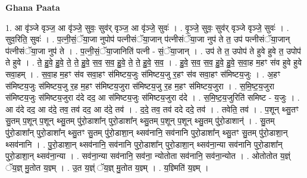 \documentclass[17pt]{extarticle}
\begin{document}
\textbf{Ghana Paata } \newline

1. आ वृ॑ञ्जे वृञ्ज॒ आ वृ॑ञ्जे॒ सुवः॒ सुव॑र् वृञ्ज॒ आ वृ॑ञ्जे॒ सुवः॑ । . वृ॒ञ्जे॒ सुवः॒ सुव॑र् वृञ्जे वृञ्जे॒ सुवः॑ । . सुव॒रिति॒ सुवः॑ । . प॒त्नी॒सं॒ॅया॒जा नुपोप॑ पत्नीसंॅया॒जान् प॑त्नीसंॅया॒जा नुप॑ ते त॒ उप॑ पत्नीसंॅया॒जान् प॑त्नीसंॅया॒जा नुप॑ ते । . प॒त्नी॒सं॒ॅया॒जानिति॑ पत्नी - सं॒ॅया॒जान् । . उप॑ ते त॒ उपोप॑ ते हुवे हुवे त॒ उपोप॑ ते हुवे । . ते॒ हु॒वे॒ हु॒वे॒ ते॒ ते॒ हु॒वे॒ स॒व॒ स॒व॒ हु॒वे॒ ते॒ ते॒ हु॒वे॒ स॒व॒ । . हु॒वे॒ स॒व॒ स॒व॒ हु॒वे॒ हु॒वे॒ स॒वा॒ह म॒हꣳ स॑व हुवे हुवे सवा॒हम् । . स॒वा॒ह म॒हꣳ स॑व सवा॒हꣳ स॑मिष्टय॒जुः स॑मिष्टय॒जु र॒हꣳ स॑व सवा॒हꣳ स॑मिष्टय॒जुः । . अ॒हꣳ स॑मिष्टय॒जुः स॑मिष्टय॒जु र॒ह म॒हꣳ स॑मिष्टय॒जुरा स॑मिष्टय॒जु र॒ह म॒हꣳ स॑मिष्टय॒जुरा । . स॒मि॒ष्ट॒य॒जुरा स॑मिष्टय॒जुः स॑मिष्टय॒जुरा द॑दे दद॒ आ स॑मिष्टय॒जुः स॑मिष्टय॒जुरा द॑दे । . स॒मि॒ष्ट॒य॒जुरिति॑ समिष्ट - य॒जुः । . आ द॑दे दद॒ आ द॑दे॒ तव॒ तव॑ दद॒ आ द॑दे॒ तव॑ । . द॒दे॒ तव॒ तव॑ ददे ददे॒ तव॑ । . तवेति॒ तव॑ । . प॒शून् थ्सु॒तꣳ सु॒तम् प॒शून् प॒शून् थ्सु॒तम् पु॑रो॒डाशा᳚न् पुरो॒डाशा᳚न् थ्सु॒तम् प॒शून् प॒शून् थ्सु॒तम् पु॑रो॒डाशान्॑ । . सु॒तम् पु॑रो॒डाशा᳚न् पुरो॒डाशा᳚न् थ्सु॒तꣳ सु॒तम् पु॑रो॒डाशा॒न् थ्सव॑नानि॒ सव॑नानि पुरो॒डाशा᳚न् थ्सु॒तꣳ सु॒तम् पु॑रो॒डाशा॒न् थ्सव॑नानि । . पु॒रो॒डाशा॒न् थ्सव॑नानि॒ सव॑नानि पुरो॒डाशा᳚न् पुरो॒डाशा॒न् थ्सव॑ना॒न्या सव॑नानि पुरो॒डाशा᳚न् पुरो॒डाशा॒न् थ्सव॑ना॒न्या । . सव॑ना॒न्या सव॑नानि॒ सव॑ना॒ न्योतोता सव॑नानि॒ सव॑ना॒न्योत । . ओतोतोत य॒ज्ञ्ं ॅय॒ज्ञ् मु॒तोत य॒ज्ञ्म् । . उ॒त य॒ज्ञ्ं ॅय॒ज्ञ् मु॒तोत य॒ज्ञ्म् । . य॒ज्ञ्मिति॑ य॒ज्ञ्म् । \newline
\end{document}
